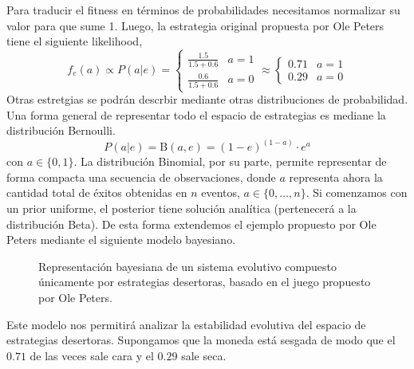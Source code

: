 \documentclass[a4paper,10pt]{article}
\begin{document}
Para traducir el fitness en términos de probabilidades necesitamos normalizar su valor para que sume 1.
Luego, la estrategia original propuesta por Ole Peters tiene el siguiente likelihood,
%
\begin{equation}
f_e(a) \propto  P(a|e) = \begin{cases}
 \frac{1.5}{1.5+0.6} & a = 1 \\
 \frac{0.6}{1.5+0.6} & a = 0
  \end{cases}
  \approx
\begin{cases}
 0.71 & a= 1 \\
 0.29 & a= 0
\end{cases}
\end{equation}
%
Otras estretgias se podrán descrbir mediante otras distribuciones de probabilidad.
Una forma general de representar todo el espacio de estrategias es mediane la distribución Bernoulli.
%
\begin{equation}
P(a|e) = \text{B}(a,e) = (1-e)^{(1-a)} \cdot e^a 
\end{equation}
%
con $a \in \{0,1\}$.
La distribución Binomial, por su parte, permite representar de forma compacta una secuencia de observaciones, donde $a$ representa ahora la cantidad total de éxitos obtenidas en $n$ eventos, $a \in \{0, \dots, n\}$.
Si comenzamos con un prior uniforme, el posterior tiene solución analítica (pertenecerá a la distribución Beta).
De esta forma extendemos el ejemplo propuesto por Ole Peters mediante el siguiente modelo bayesiano.
%
\begin{figure}[H]
\centering
{}
\caption{Representación bayesiana de un sistema evolutivo compuesto únicamente por estrategias desertoras, basado en el juego propuesto por Ole Peters.}
\label{fig:modelo_beta_binomial}
\end{figure}
%
Este modelo nos permitirá analizar la estabilidad evolutiva del espacio de estrategias desertoras. 
Supongamos que la moneda está sesgada de modo que el $0.71$ de las veces sale cara y el $0.29$ sale seca.
\end{document}
